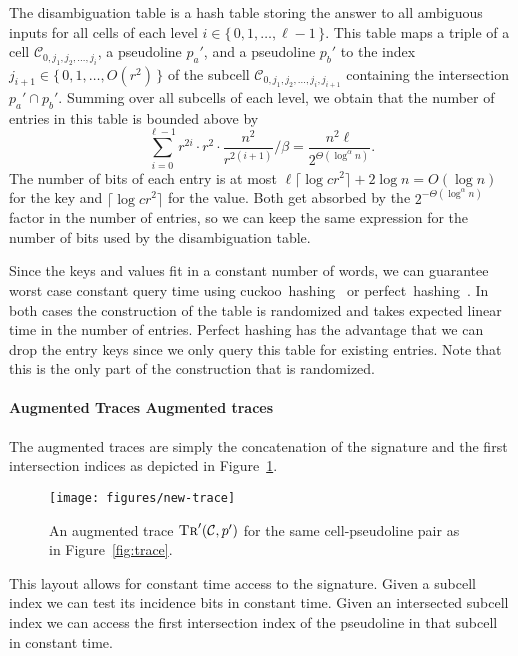The disambiguation table is a hash table storing the answer to all ambiguous
inputs for all cells of each level \(i \in \{\, 0,1, \ldots, \ell -1\,\}\).
%
This table maps a triple of a cell
\(\mathcal{C}_{0,j_1,j_2,\ldots,j_i}\),
a pseudoline \(p_a'\),
and a pseudoline \(p_b'\) to the index \( j_{i+1} \in \{\, 0,1, \ldots, O(r^2)\,\}\) of
the subcell \(\mathcal{C}_{0,j_1,j_2,\ldots,j_i,j_{i+1}}\) containing the
intersection \(p_a' \cap p_b'\).
%
Summing over all subcells of each level, we obtain that the
number of entries in this table is bounded above by
\begin{displaymath}
  \sum_{i=0}^{\ell - 1}  r^{2i} \cdot r^2 \cdot \frac{n^2}{r^{2(i+1)}} / \beta
  =
  \frac{n^2 \ell}{2^{\Theta(\log^{\alpha} n)}}.
\end{displaymath}
%
The number of bits of each entry is at most \(\ell \lceil \log cr^2 \rceil + 2 \log n =
O(\log n)\) for the key and
\(\lceil \log cr^2 \rceil\) for the value. Both get absorbed by the
\(2^{-\Theta(\log^{\alpha} n)}\) factor in the number of entries, so we can
keep the same expression for the number of bits used by the disambiguation table.

Since the keys and values fit in a constant number of words,
we can guarantee worst case constant query time using
cuckoo~hashing~\cite{PR04} or
perfect~hashing~\cite{FKS84}.
%
In both cases the construction of the table is randomized
and takes expected linear time in the number of entries.
Perfect hashing has the advantage that we can drop the entry keys since we
only query this table for existing entries.
Note that this is the only part of the construction that is randomized.

\paragraph*{\iftitlecase%
Augmented Traces\else%
Augmented traces\fi}

The augmented traces are simply the concatenation of the signature and the
first intersection indices as depicted in Figure~\ref{fig:new-trace}.
%
\begin{figure}
  \centering{}
  \texttt{[image: figures/new-trace]}
  \caption{%
	  An augmented trace \(\textsc{Tr}'(\mathcal{C}, p')\)
      for the same cell-pseudoline pair as in Figure~\ref{fig:trace}.
  }\label{fig:new-trace}
\end{figure}
%
This layout allows for constant time access to the signature.
Given a subcell index we can test its incidence bits in constant time.
Given an intersected subcell index we can access the first intersection index
of the pseudoline in that subcell in constant time.

